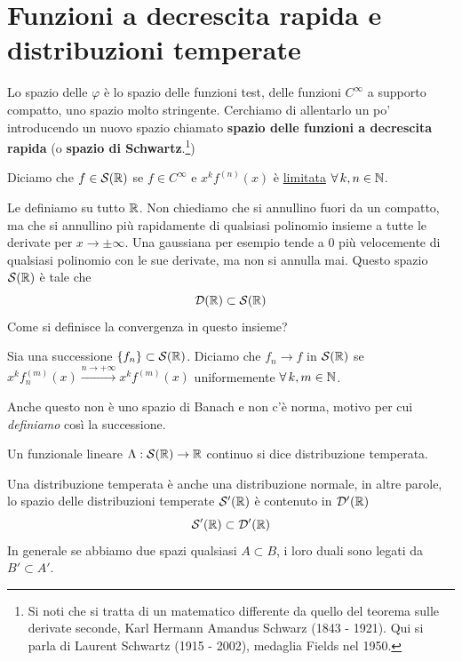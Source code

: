 \section{Funzioni a decrescita rapida e distribuzioni temperate}

Lo spazio delle $\varphi $ è lo spazio delle funzioni test, delle funzioni $C^{\infty}$ a supporto compatto, uno spazio molto stringente. Cerchiamo di allentarlo un po' introducendo un nuovo spazio chiamato \textbf{spazio delle funzioni a decrescita rapida} (o \textbf{spazio di Schwartz}.\footnote{Si noti che si tratta di un matematico differente da quello del teorema sulle derivate seconde, Karl Hermann Amandus Schwarz (1843 - 1921). Qui si parla di Laurent Schwartz (1915 - 2002), medaglia Fields nel 1950.})
\begin{defn}
Diciamo che $f\in \mathcal{S}(\mathbb{R})$ se $\boxed{f\in C^{\infty}}$ e $\boxed{x^{k} f^{(n)}(x)}$ è \underline{limitata} $\forall k, n\in \NN$.
\end{defn}
Le definiamo su tutto $\mathbb{R}$. Non chiediamo che si annullino fuori da un compatto, ma che si annullino più rapidamente di qualsiasi polinomio insieme a tutte le derivate per $x\rightarrow \pm \infty $. Una gaussiana per esempio tende a $0$ più velocemente di qualsiasi polinomio con le sue derivate, ma non si annulla mai. Questo spazio $\mathcal{S}(\mathbb{R})$ è tale che
\begin{equation*}
\mathcal{D}(\mathbb{R}) \subset \mathcal{S}(\mathbb{R})
\end{equation*}
Come si definisce la convergenza in questo insieme?
\begin{defn}
[Convergenza in $\Sc$]Sia una successione $\{f_{n}\} \subset \mathcal{S}(\mathbb{R})$. Diciamo che $f_{n}\rightarrow f$ in $\mathcal{S}(\mathbb{R})$ se $x^{k} f^{(m)}_{n}(x)\xrightarrow{n\rightarrow + \infty} x^{k} f^{(m)}(x)$ uniformemente $\forall k, m\in \NN$.
\end{defn}
Anche questo non è uno spazio di Banach e non c'è norma, motivo per cui \textit{definiamo} così la successione.
\begin{defn}
Un funzionale lineare $\Lambda : \mathcal{S}(\mathbb{R})\rightarrow \mathbb{R}$ continuo si dice distribuzione temperata.
\end{defn}
Una distribuzione temperata è anche una distribuzione normale, in altre parole, lo spazio delle distribuzioni temperate $\mathcal{S}'(\mathbb{R})$ è contenuto in $\mathcal{D}'(\mathbb{R})$
\begin{equation*}
\mathcal{S}'(\mathbb{R}) \subset \mathcal{D}'(\mathbb{R})
\end{equation*}
In generale se abbiamo due spazi qualsiasi $A\subset B$, i loro duali sono legati da $B'\subset A'$.
